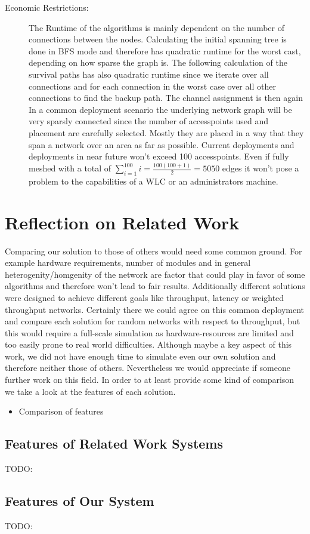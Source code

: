 \begin{description}
    \item[Economic Restrictions:]
      The Runtime of the algorithms is mainly dependent on the number of connections between the nodes. Calculating the initial spanning tree is done in BFS mode and 
      therefore has quadratic runtime for the worst cast, depending on how sparse the graph is. The following calculation of the survival paths has also quadratic runtime 
      since we iterate over all connections and for each connection in the worst case over all other connections to find the backup path. The channel assignment is then again
      In a common deployment scenario the underlying network graph will be very sparsly connected since the number of accesspoints used and placement are carefully selected.
      Mostly they are placed in a way that they span a network over an area as far as possible.
      Current deployments and deployments in near future won't exceed 100 accesspoints. 
      Even if fully meshed with a total of \(\sum \limits_{i=1}^{100} i = \frac{100(100+1)}{2}=5050\)
      edges it won't pose a problem to the capabilities of a WLC or an administrators machine.
      
  \end{description}
    
\section{Reflection on Related Work}
  Comparing our solution to those of others would need some common ground. For example hardware requirements, number of modules and in general heterogenity/homgenity of
  the network are factor that could play in favor of some algorithms and therefore won't lead to fair results. Additionally different solutions were designed to 
  achieve different goals like throughput, latency or weighted throughput networks. Certainly there we could agree on this common deployment and compare each solution for random
  networks with respect to throughput, but this would require a full-scale simulation as hardware-resources are limited and too easily prone to real world difficulties.
  Although maybe a key aspect of this work, we did not have enough time to simulate even our own solution and therefore neither those of others. Nevertheless we would appreciate
  if someone further work on this field. In order to at least provide some kind of comparison we take a look at the features of each solution.
  
  \begin{itemize}
   \item Comparison of features
  \end{itemize}

  \subsection{Features of Related Work Systems}
    TODO:
  \subsection{Features of Our System}
    TODO: